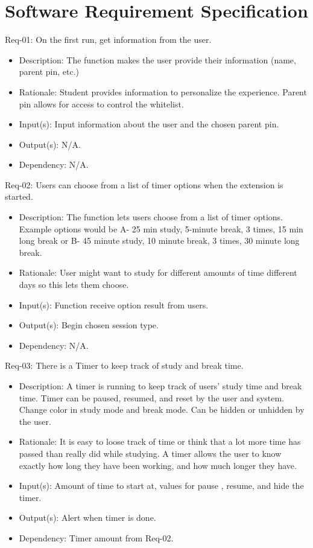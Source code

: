 \documentclass[12pt]{article}
\begin{document}
\section{Software Requirement Specification}

Req-01: On the first run, get information from the user.
\begin{itemize}
    \item Description: The function makes the user provide their information (name, parent pin, etc.) 
    \item Rationale: Student provides information to personalize the experience. Parent pin allows for access to control the whitelist.  
    \item Input(s): Input information about the user and the chosen parent pin. 
    \item Output(s): N/A. 
    \item Dependency: N/A. 
\end{itemize}
Req-02: Users can choose from a list of timer options when the extension is started. 
\begin{itemize}
    \item Description: The function lets users choose from a list of timer options. Example options would be A- 25 min study, 5-minute break, 3 times, 15 min long break or B- 45 minute study, 10 minute break, 3 times, 30 minute long break. 
    \item Rationale: User might want to study for different amounts of time different days so this lets them choose. 
    \item Input(s): Function receive option result from users. 
    \item Output(s): Begin chosen session type.
    \item Dependency: N/A.
\end{itemize}
Req-03:  There is a Timer to keep track of study and break time. 
\begin{itemize}
    \item Description: A timer is running to keep track of users’ study time and break time. Timer can be paused, resumed, and reset by the user and system. Change color in study mode and break mode. Can be hidden or unhidden by the user.
    \item Rationale: It is easy to loose track of time or think that a lot more time has passed than really did while studying. A timer allows the user to know exactly how long they have been working, and how much longer they have. 
    \item Input(s): Amount of time to start at, values for pause , resume, and hide the timer.
    \item Output(s): Alert when timer is done.
    \item Dependency: Timer amount from Req-02.
\end{itemize}
\end{document}
